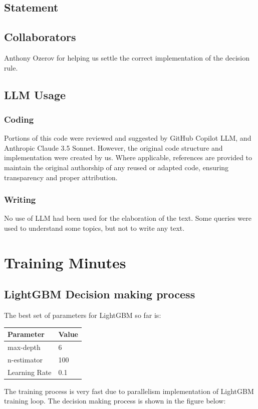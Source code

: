 \documentclass[10pt,letterpaper]{article}
\begin{document}
\subsection{Statement}

\subsection{Collaborators}
Anthony Ozerov for helping us settle the correct implementation of the decision rule.

\subsection{LLM Usage}

\subsubsection*{Coding}
Portions of this code were reviewed and suggested by GitHub Copilot LLM, and Anthropic Claude 3.5 Sonnet. However, the original code structure and implementation were created by us. Where applicable, references are provided to maintain the original authorship of any reused or adapted code, ensuring transparency and proper attribution.

\subsubsection*{Writing}
No use of LLM had been used for the elaboration of the text. Some queries were used to understand some topics, but not to write any text.

\section{Training Minutes}
\subsection{LightGBM Decision making process}
The best set of parameters for LightGBM so far is:
\begin{table}[H]
    \centering
    \begin{tabular}{ll}
    \textbf{Parameter} & \textbf{Value} \\
    \hline
    max-depth & 6 \\
    n-estimator & 100 \\
    Learning Rate & 0.1 \\
    \end{tabular}
    \end{table}
The training process is very fast due to parallelism implementation of LightGBM training loop. The decision making process is shown in the figure below:
\end{document}
